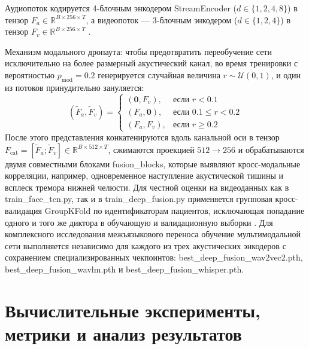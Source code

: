\documentclass[a4paper,14pt]{extarticle}
\begin{document}
	Аудиопоток кодируется 4-блочным энкодером StreamEncoder ($d \in \{1, 2, 4, 8\}$) в тензор $F_a \in \mathbb{R}^{B \times 256 \times T}$, а видеопоток — 3-блочным энкодером ($d \in \{1, 2, 4\}$) в тензор $F_v \in \mathbb{R}^{B \times 256 \times T}$ \cite{tcn}.
	
	Механизм модального дропаута: чтобы предотвратить переобучение сети исключительно на более размерный акустический канал, во время тренировки с вероятностью $p_{\text{mod}} = 0.2$ генерируется случайная величина $r \sim \mathcal{U}(0, 1)$, и один из потоков принудительно зануляется:
	\begin{equation}
		(\tilde{F}_a, \tilde{F}_v) = \begin{cases}
			(\mathbf{0}, F_v), & \text{если } r < 0.1 \\
			(F_a, \mathbf{0}), & \text{если } 0.1 \le r < 0.2 \\
			(F_a, F_v), & \text{если } r \ge 0.2
		\end{cases}
	\end{equation}
	После этого представления конкатенируются вдоль канальной оси в тензор $F_{\text{cat}} = [\tilde{F}_a; \tilde{F}_v] \in \mathbb{R}^{B \times 512 \times T}$, сжимаются проекцией $512 \to 256$ и обрабатываются двумя совместными блоками fusion\_blocks, которые выявляют кросс-модальные корреляции, например, одновременное наступление акустической тишины и всплеск тремора нижней челюсти. Для честной оценки на видеоданных как в train\_\allowbreak face\_\allowbreak tcn.py, так и в train\_\allowbreak deep\_\allowbreak fusion.py применяется групповая кросс-валидация GroupKFold по идентификаторам пациентов, исключающая попадание одного и того же диктора в обучающую и валидационную выборки \cite{ivankin}. Для комплексного исследования межъязыкового переноса обучение мультимодальной сети выполняется независимо для каждого из трех акустических энкодеров с сохранением специализированных чекпоинтов: best\_\allowbreak deep\_\allowbreak fusion\_\allowbreak wav2vec2.pth, best\_\allowbreak deep\_\allowbreak fusion\_\allowbreak wavlm.pth и best\_\allowbreak deep\_\allowbreak fusion\_\allowbreak whisper.pth.
	
	\newpage
	\section{Вычислительные эксперименты, метрики и анализ результатов}
	
\end{document}
